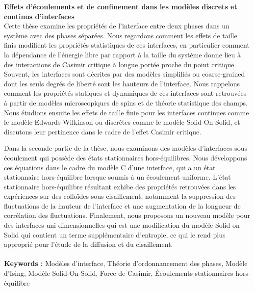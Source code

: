 {\bf Effets d'écoulements et de confinement dans les modèles discrets et continus d'interfaces} \\

Cette thèse examine les propriétés de l'interface entre deux phases dans un système avec des phases séparées. Nous regardons comment les effets de taille finis modifient les propriétés statistiques de ces interfaces, en particulier comment la dépendance de l'énergie libre par rapport à la taille du système donne lieu à des interactions de Casimir critique à longue portée proche du point critique.
Souvent, les interfaces sont décrites par des modèles simplifiés ou coarse-grained dont les seuls degrés de liberté sont les hauteurs de l'interface. Nous rappelons comment les propriétés statiques et dynamiques de ces interfaces sont retrouvées à partir de modèles microscopiques de spins et de théorie statistique des champs.
Nous étudions ensuite les effets de taille finie pour les interfaces continues comme le modèle Edwards-Wilkinson ou discrètes comme le modèle Solid-On-Solid, et discutons leur pertinence dans le cadre de l'effet Casimir critique.

Dans la seconde partie de la thèse, nous examinons des modèles d'interfaces sous écoulement qui possède des états stationnaires hors-équilibres. Nous développons 
ces équations dans le cadre du modèle C d'une interface, qui a un état stationnaire hors-équilibre lorsque soumis à un écoulement uniforme. L'état stationnaire hors-équilibre résultant exhibe des propriétés retrouvées dans les expériences sur des colloïdes sous cisaillement, notamment la suppression des fluctuations de la hauteur de l'interface et une augmentation de la longueur de corrélation des fluctuations. 
Finalement, nous proposons un nouveau modèle pour des interfaces uni-dimensionnelles qui est une modification du modèle Solid-on-Solid qui contient un terme supplémentaire d'entropie, ce qui le rend plus approprié pour l'étude de la diffusion et du cisaillement.
\\ \\
{\bf Keywords : } Modèles d'interface, Théorie d'ordonnancement des phases, Modèle d'Ising, Modèle Solid-On-Solid, Force de Casimir, Écoulements stationnaires hors-équilibre




